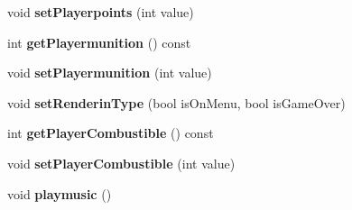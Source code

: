 \begin{DoxyCompactItemize}
\item 
\hypertarget{class_crazy_river_ride_ae422c0571f910c124ed96c680892d19b}{void {\bfseries set\-Playerpoints} (int value)}\label{class_crazy_river_ride_ae422c0571f910c124ed96c680892d19b}

\item 
\hypertarget{class_crazy_river_ride_adab75d641f8df41b15851c0139b37cd3}{int {\bfseries get\-Playermunition} () const }\label{class_crazy_river_ride_adab75d641f8df41b15851c0139b37cd3}

\item 
\hypertarget{class_crazy_river_ride_ae773c56d054fd73adadf6f2ab3e725e1}{void {\bfseries set\-Playermunition} (int value)}\label{class_crazy_river_ride_ae773c56d054fd73adadf6f2ab3e725e1}

\item 
\hypertarget{class_crazy_river_ride_a33d1c49da5c75f486a5a6cf468ea194d}{void {\bfseries set\-Renderin\-Type} (bool is\-On\-Menu, bool is\-Game\-Over)}\label{class_crazy_river_ride_a33d1c49da5c75f486a5a6cf468ea194d}

\item 
\hypertarget{class_crazy_river_ride_a7ff417550948dd28d538e614fd23d91b}{int {\bfseries get\-Player\-Combustible} () const }\label{class_crazy_river_ride_a7ff417550948dd28d538e614fd23d91b}

\item 
\hypertarget{class_crazy_river_ride_ab9d581ecdc75251102d8c243d47fbe00}{void {\bfseries set\-Player\-Combustible} (int value)}\label{class_crazy_river_ride_ab9d581ecdc75251102d8c243d47fbe00}

\item 
\hypertarget{class_crazy_river_ride_a48c19baeb07b2e81d2663adc70ede714}{void {\bfseries playmusic} ()}\label{class_crazy_river_ride_a48c19baeb07b2e81d2663adc70ede714}

\end{DoxyCompactItemize}
